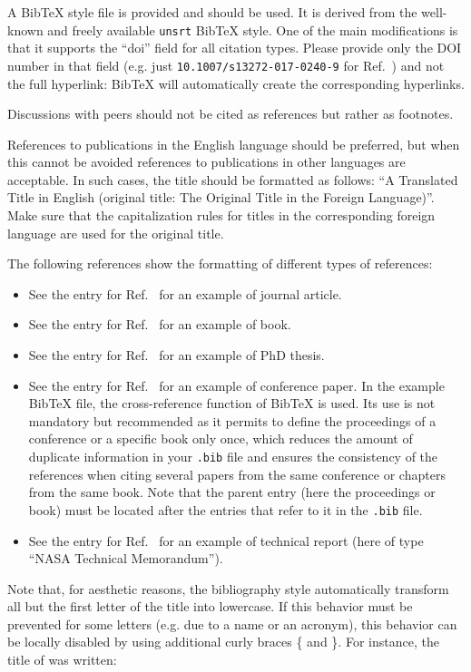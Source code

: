 \documentclass{CEAS_EuroGNC_2024}
\begin{document}
A BibTeX style file is provided and should be used. It is derived from the well-known and freely available \texttt{unsrt} BibTeX style. One of the main modifications is that it supports the ``doi'' field for all citation types. Please provide only the DOI number in that field (e.g. just \verb|10.1007/s13272-017-0240-9| for Ref.~\cite{FezSchFis2017}) and not the full hyperlink: BibTeX will automatically create the corresponding hyperlinks.

Discussions with peers should not be cited as references but rather as footnotes.

References to publications in the English language should be preferred, but when this cannot be avoided references to publications in other languages are acceptable. In such cases, the title should be formatted as follows: ``A Translated Title in English (original title: The Original Title in the Foreign Language)''. Make sure that the capitalization rules for titles in the corresponding foreign language are used for the original title.

The following references show the formatting of different types of references:\begin{itemize}
\item See the entry for Ref.~\cite{FezSchFis2017} for an example of journal article.
\item See the entry for Ref.~\cite{zhou1996robust} for an example of book.
\item See the entry for Ref.~\cite{PhD_Thesis_Koethe} for an example of PhD thesis.
\item See the entry for Ref.~\cite{SchFezNie2019} for an example of conference paper. In the example BibTeX file, the cross-reference function of BibTeX is used. Its use is not mandatory but recommended as it permits to define the proceedings of a conference or a specific book only once, which reduces the amount of duplicate information in your \verb|.bib| file and ensures the consistency of the references when citing several papers from the same conference or chapters from the same book. Note that the parent entry (here the proceedings or book) must be located after the entries that refer to it in the \verb|.bib| file.
\item See the entry for Ref.~\cite{NASA_TM4511} for an example of technical report (here of type ``NASA Technical Memorandum'').
\end{itemize}

Note that, for aesthetic reasons, the bibliography style automatically transform all but the first letter of the title into lowercase. If this behavior must be prevented for some letters (e.g. due to a name or an acronym), this behavior can be locally disabled by using additional curly braces \{ and \}. For instance, the title of \cite{FezSchFis2017} was written: 
\end{document}
